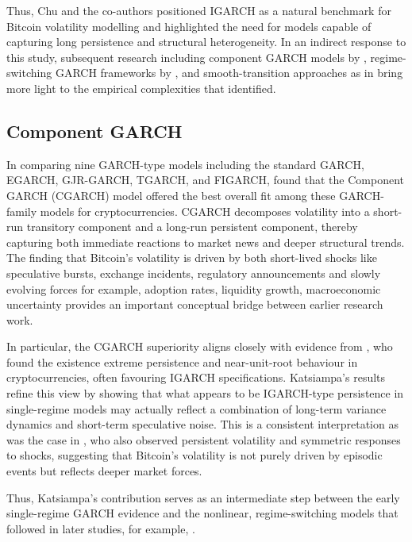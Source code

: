 \documentclass[12pt]{report}
\begin{document}
Thus, Chu and the co-authors positioned IGARCH as a natural benchmark for Bitcoin volatility modelling and highlighted the need for models capable of capturing long persistence and structural heterogeneity. In an indirect response to this study, subsequent research including component GARCH models 
by \cite{katsiampa2017volatility}, regime-switching GARCH frameworks by \cite{ardia2019regime}, and smooth-transition approaches as in \cite{bencheikh2020stgarch} bring more light to the empirical complexities that \cite{chu2017garchcrypto} identified.


\subsection{Component GARCH}

In comparing nine GARCH-type models including the standard GARCH, EGARCH, GJR-GARCH, TGARCH, and FIGARCH, \cite{katsiampa2017volatility} found that the Component GARCH (CGARCH) model offered the best overall fit among these GARCH-family models for cryptocurrencies. CGARCH decomposes volatility into a short-run transitory component and a long-run persistent component, thereby capturing both immediate reactions to market news and deeper structural trends. The finding that Bitcoin's volatility is driven by both short-lived shocks like speculative bursts, exchange incidents, regulatory announcements and slowly evolving forces for example, adoption rates, liquidity growth, macroeconomic uncertainty provides an important 
conceptual bridge between earlier research work.

In particular, the CGARCH superiority aligns closely with evidence from \cite{chu2017garchcrypto}, who found the existence extreme persistence and near-unit-root behaviour in cryptocurrencies, often favouring IGARCH specifications. Katsiampa's results refine this view by showing that what appears to be IGARCH-type persistence in single-regime models may actually 
reflect a combination of long-term variance dynamics and short-term speculative noise. This is a consistent interpretation as was the case in \cite{dyhrberg2016bitcoin}, who also observed persistent volatility and symmetric responses to shocks, suggesting that Bitcoin’s volatility is not purely driven by episodic events but reflects deeper market forces.

Thus, Katsiampa’s contribution serves as an intermediate step between the early single-regime GARCH evidence and the nonlinear, regime-switching models that followed in later studies, for example, \cite{ardia2019regime}. 
\end{document}
